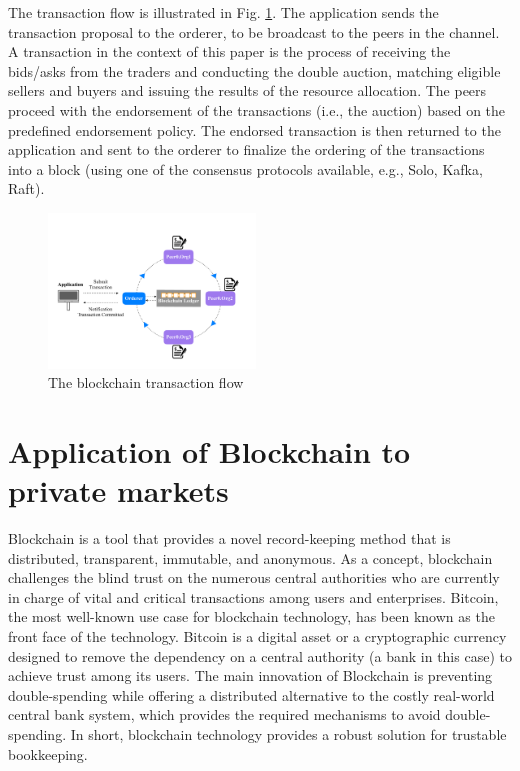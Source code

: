 \documentclass[conference]{IEEEtran}
\begin{document}
The transaction flow is illustrated in Fig.  \ref{fig:flow}. The application sends the transaction proposal to the orderer, to be broadcast to the peers in the channel. A transaction in the context of this paper is the process of receiving the bids/asks from the traders and conducting the double auction, matching eligible sellers and buyers and issuing the results of the resource allocation. The peers proceed with the endorsement of the transactions (i.e., the auction) based on the predefined endorsement policy. The endorsed transaction is then returned to the application and sent to the orderer to finalize the ordering of the transactions into a block (using one of the consensus protocols available, e.g., Solo, Kafka, Raft).

\begin{figure}
    \centering
    \includegraphics[width=0.49\textwidth]{figs/Fig.pdf}
    \caption{The blockchain transaction flow}
    \label{fig:flow}
\end{figure}

\section{Application of Blockchain to private markets}
Blockchain is a tool that provides a novel record-keeping method that is distributed, transparent, immutable, and anonymous. As a concept, blockchain challenges the blind trust on the numerous central authorities who are currently in charge of vital and critical transactions among users and enterprises. 
Bitcoin, the most well-known use case for blockchain technology, has been known as the front face of the technology. Bitcoin is a digital asset or a cryptographic currency designed to remove the dependency on a central authority (a bank in this case) to achieve trust among its users.
The main innovation of  Blockchain is preventing double-spending while offering a distributed alternative to the costly real-world central bank system, which provides the required mechanisms to avoid double-spending. In short, blockchain technology provides a robust solution for trustable bookkeeping.
\end{document}

